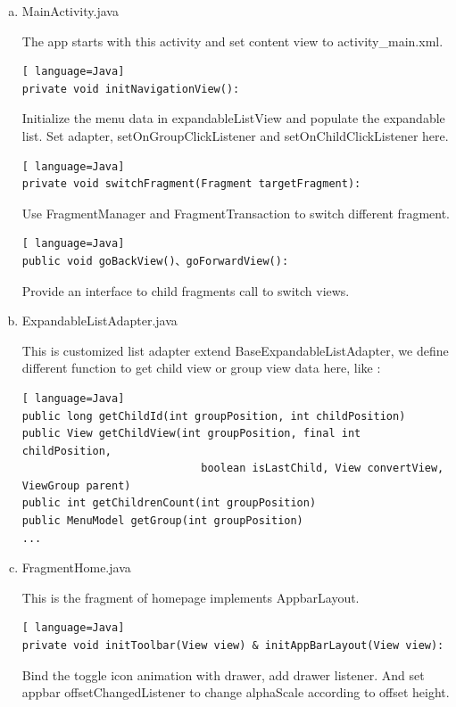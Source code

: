 \documentclass{article}
\begin{document}
    \begin{enumerate}[a)]
    \item MainActivity.java
    
    The app starts with this activity and 
    set content view to activity\_main.xml.

    \begin{lstlisting}[ language=Java]
private void initNavigationView():
    \end{lstlisting}
    Initialize the menu data in expandableListView and populate the expandable list. Set adapter, setOnGroupClickListener and setOnChildClickListener here.

    \begin{lstlisting}[ language=Java]
private void switchFragment(Fragment targetFragment):
    \end{lstlisting}
Use FragmentManager and FragmentTransaction to switch different fragment.

    \begin{lstlisting}[ language=Java]
public void goBackView()、goForwardView():
    \end{lstlisting}
    Provide an interface to child fragments call to switch views.

    \item ExpandableListAdapter.java
    
    This is customized list adapter extend BaseExpandableListAdapter, 
    we define different function to get child view or group view data here, 
    like :
    \begin{lstlisting}[ language=Java]
public long getChildId(int groupPosition, int childPosition)
public View getChildView(int groupPosition, final int childPosition,
                            boolean isLastChild, View convertView, ViewGroup parent)
public int getChildrenCount(int groupPosition)
public MenuModel getGroup(int groupPosition)
...        
    \end{lstlisting}
    
    \item FragmentHome.java
    
    This is the fragment of homepage implements AppbarLayout.

    \begin{lstlisting}[ language=Java]
private void initToolbar(View view) & initAppBarLayout(View view):
    \end{lstlisting}

    Bind the toggle icon animation with drawer, add drawer listener. 
    And set appbar offsetChangedListener to change alphaScale 
    according to offset height. 


\end{enumerate}
\end{document}
